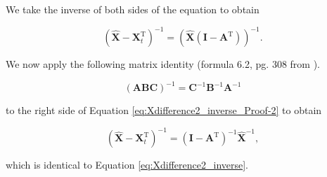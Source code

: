 \documentclass[authoryear,preprint,review,12pt]{elsarticle}
\let\oldhat\hat
\renewcommand{\vec}[1]{\mathbf{#1}}
\renewcommand{\hat}[1]{\oldhat{\mathbf{#1}}}
\begin{document}
\noindent We take the inverse of both sides of the equation to obtain

\begin{equation} \label{eq:Xdifference2_inverse_Proof-2}
	\left(\hat{\vec{X}} - \vec{X}_t^\mathrm{T}\right)^{-1} = \left(\hat{\vec{X}}(\vec{I} - \vec{A}^\mathrm{T})\right)^{-1}.
\end{equation}

\noindent We now apply the following matrix identity (formula 6.2, pg. 308 from \cite{Zwillinger2011}).


\begin{equation} \label{eq:Xdifference2_inverse_Proof-3}
	\left(\vec{A}\vec{B}\vec{C}\right)^{-1} = \vec{C}^{-1} \vec{B}^{-1} \vec{A}^{-1}
\end{equation}

\noindent to the right side of Equation \ref{eq:Xdifference2_inverse_Proof-2} to obtain

\begin{equation} \label{eq:Xdifference2_inverse_Proof-4}
	\left(\hat{\vec{X}} - \vec{X}_t^\mathrm{T}\right)^{-1} = (\vec{I} - \vec{A}^{\mathrm{T}})^{-1} \hat{\vec{X}}^{-1},
\end{equation}

\noindent which is identical to Equation \ref{eq:Xdifference2_inverse}.
\end{document}

